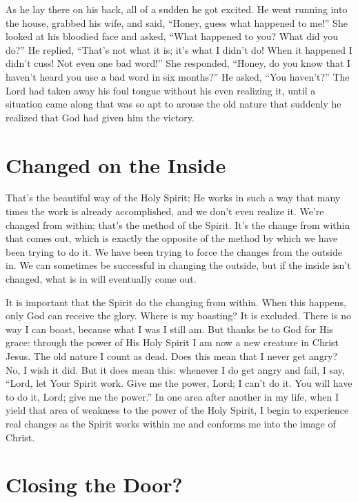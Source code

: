 As he lay there on his back, all of a sudden he got
excited. He went running into the house, grabbed his wife,
and said, “Honey, guess what happened to me!” She looked
at his bloodied face and asked, “What happened to you?
What did you do?” He replied, “That’s not what it is; it’s
what I didn’t do! When it happened I didn’t cuss! Not even
one bad word!” She responded, “Honey, do you know that
I haven’t heard you use a bad word in six months?” He
asked, “You haven’t?” The Lord had taken away his foul
tongue without his even realizing it, until a situation came
along that was so apt to arouse the old nature that suddenly
he realized that God had given him the victory.


\section*{Changed on the Inside}

That’s the beautiful way of the Holy Spirit; He works
in such a way that many times the work is already accomplished,
and we don’t even realize it. We’re changed from
within; that’s the method of the Spirit. It’s the change from
within that comes out, which is exactly the opposite of the
method by which we have been trying to do it. We have
been trying to force the changes from the outside in. We can
sometimes be successful in changing the outside, but if the
inside isn’t changed, what is in will eventually come out.

It is important that the Spirit do the changing from
within. When this happens, only God can receive the glory.
Where is my boasting? It is excluded. There is no way I can
boast, because what I was I still am. But thanks be to God
for His grace: through the power of His Holy Spirit I am
now a new creature in Christ Jesus. The old nature I count
as dead. Does this mean that I never get angry? No, I wish it
did. But it does mean this: whenever I do get angry and fail,
I say, “Lord, let Your Spirit work. Give me the power, Lord; I
can’t do it. You will have to do it, Lord; give me the power.”
In one area after another in my life, when I yield that area
of weakness to the power of the Holy Spirit, I begin to experience
real changes as the Spirit works within me and conforms
me into the image of Christ.

\section*{Closing the Door?}

